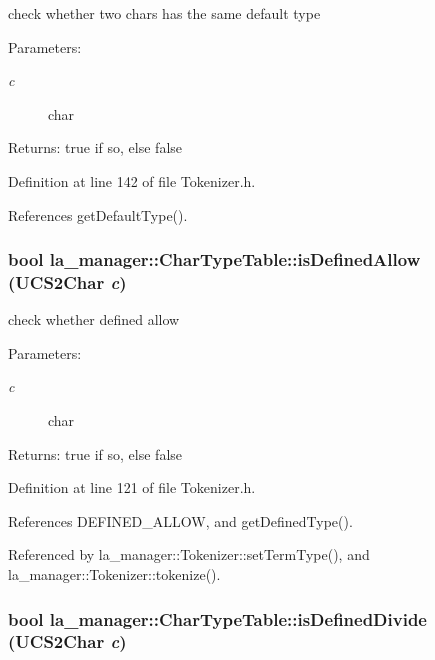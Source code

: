 check whether two chars has the same default type 

\begin{Desc}
\item[Parameters:]
\begin{description}
\item[{\em c}]char \end{description}
\end{Desc}
\begin{Desc}
\item[Returns:]true if so, else false \end{Desc}


Definition at line 142 of file Tokenizer.h.

References getDefaultType().\hypertarget{classla__manager_1_1CharTypeTable_9fcbc2d5747462459023da70ccf0631d}{
\subsubsection[{isDefinedAllow}]{\setlength{\rightskip}{0pt plus 5cm}bool la\_\-manager::CharTypeTable::isDefinedAllow (UCS2Char {\em c})}}
\label{classla__manager_1_1CharTypeTable_9fcbc2d5747462459023da70ccf0631d}


check whether defined allow 

\begin{Desc}
\item[Parameters:]
\begin{description}
\item[{\em c}]char \end{description}
\end{Desc}
\begin{Desc}
\item[Returns:]true if so, else false \end{Desc}


Definition at line 121 of file Tokenizer.h.

References DEFINED\_\-ALLOW, and getDefinedType().

Referenced by la\_\-manager::Tokenizer::setTermType(), and la\_\-manager::Tokenizer::tokenize().\hypertarget{classla__manager_1_1CharTypeTable_ad7404ec8db73433231eec802efea540}{
\subsubsection[{isDefinedDivide}]{\setlength{\rightskip}{0pt plus 5cm}bool la\_\-manager::CharTypeTable::isDefinedDivide (UCS2Char {\em c})}}
\label{classla__manager_1_1CharTypeTable_ad7404ec8db73433231eec802efea540}


